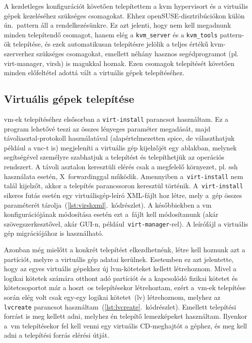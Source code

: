 A kezdetleges konfigurációt követően telepítettem a \acrshort{kvm} \gls{hypervisor}t és a virtuális gépek kezeléséhez szükséges csomagokat. Ehhez openSUSE-disztribúciókon külön ún.~pattern áll a rendelkezésünkre. Ez azt jelenti, hogy nem kell megadnunk minden telepítendő csomagot, hanem elég a \texttt{kvm\_server} és a \texttt{kvm\_tools} pattern-ök telepítése, és ezek automatikusan telepítésre jelölik a teljes értékű \acrshort{kvm}-szerverhez szükséges csomagokat, emellett néhány hasznos segédprogramot (pl. virt-manager, virsh) is magukkal hoznak. Ezen csomagok telepítését követően minden előfeltétel adottá vált a virtuális gépek telepítéséhez.


\subsection{Virtuális gépek telepítése}
\acrshort{vm}-ek telepítéséhez elsősorban a \texttt{virt-install} parancsot használtam. Ez a program lehetővé teszi az összes lényeges paraméter megadását, majd távoliasztal-protokoll használatával (alapértelmezetten \acrshort{spice}, de választhatjuk például a \acrshort{vnc}-t is) megjeleníti a virtuális gép kijelzőjét egy ablakban, melynek segítségével személyre szabhatjuk a telepítést és telepíthetjük az operációs rendszert. A távoli asztalon keresztüli elérés csak a megfelelő környezet, pl. \acrshort{ssh} használata esetén, X~forwardinggal működik. Amennyiben a~\texttt{virt-install} nem talál kijelzőt, akkor a telepítés parancssoron keresztül történik. A~\texttt{virt-install} sikeres futás esetén egy virtuálisgép-leíró XML-fájlt hoz létre, mely a~gép összes paraméterét tárolja~(\ref{lst:virshxml}.~kódrészlet). A későbbiekben a \acrshort{vm} konfigurációjának módosítása esetén ezt a~fájlt kell módosítanunk (akár szövegszerkesztővel, akár GUI-n, például~\texttt{virt-manager}-rel). A leírófájl a virtuális gép migrációjához is használható.

\vspace{2mm}
\begin{figure}[htb]
	
\end{figure}

Azonban még mielőtt a konkrét telepítést elkezdhetnénk, létre kell hoznunk azt a partíciót, melyre a virtuális gép adatai kerülnek. Esetemben ez azt jelentette, hogy az egyes virtuális gépekhez új \acrshort{lvm}-köteteket kellett létrehoznom. Mivel a logikai kötetek számára otthont adó partíciót és a kapcsolódó fizikai kötetet és kötetcsoportot már a hoszt~\acrshort{os} telepítésekor létrehoztam, ezért a~\acrshort{vm}-ek telepítése során elég volt csak egy-egy logikai kötetet~(\acrshort{lv}) létrehoznom, melyhez az \texttt{lvcreate} parancsot használtam~(\ref{lst:lvcreate}.~kódrészlet).
Emellett telepítési forrást is meg kellett adni, melyhez én telepítő lemezképeket használtam. Ilyenkor a~\acrshort{vm} telepítésekor fel kell venni egy virtuális CD-meghajtót a géphez, és meg kell adni a telepítési forrás elérési útját.

